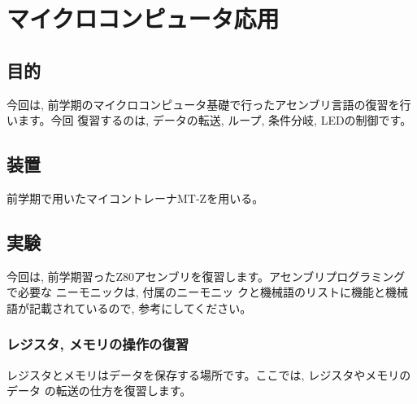 \chapter{マイクロコンピュータ応用}

\section{目的}

今回は, 前学期のマイクロコンピュータ基礎で行ったアセンブリ言語の復習を行います。今回
復習するのは, データの転送, ループ, 条件分岐, LEDの制御です。

\section{装置}

前学期で用いたマイコントレーナMT-Zを用いる。

\section{実験 }

今回は, 前学期習ったZ80アセンブリを復習します。アセンブリプログラミングで必要な
ニーモニックは, 付属のニーモニッ
クと機械語のリストに機能と機械語が記載されているので, 参考にしてください。

\subsection{レジスタ, メモリの操作の復習}


レジスタとメモリはデータを保存する場所です。ここでは, レジスタやメモリのデータ
の転送の仕方を復習します。

